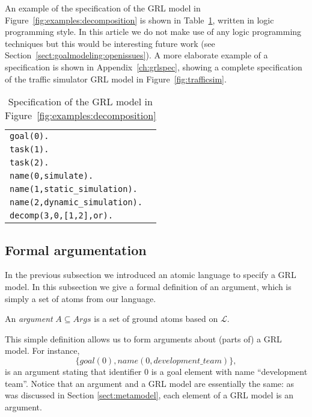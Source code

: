 An example of the specification of the GRL model in Figure~\ref{fig:examples:decomposition} is shown in Table~\ref{table:grl_atom_spec}, written in logic programming style. In this article we do not make use of any logic programming techniques but this would be interesting future work (see Section~\ref{sect:goalmodeling:openissues}). A more elaborate example of a specification is shown in Appendix~\ref{ch:grlspec}, showing a complete specification of the traffic simulator GRL model in Figure~\ref{fig:trafficsim}.

\begin{table}[h!]
\centering
\begin{tabularx}{0.4\textwidth}{|X|}
\hline
\texttt{goal(0).}\\
\texttt{task(1).}\\
\texttt{task(2).}\\
\texttt{name(0,simulate).}\\
\texttt{name(1,static\_simulation).}\\
\texttt{name(2,dynamic\_simulation).}\\
\texttt{decomp(3,0,[1,2],or).}\\
\hline
\end{tabularx}
\caption{Specification of the GRL model in Figure~\ref{fig:examples:decomposition}}
\label{table:grl_atom_spec}
\end{table}

\subsection{Formal argumentation}
\label{sect:goalmodeling:argumentationsemantics}

In the previous subsection we introduced an atomic language to specify a GRL model. In this subsection we give a formal definition of an argument, which is simply a set of atoms from our language.

\begin{definition}[Argument] \label{def:argument}
An \emph{argument} $A\subseteq Args$ is a set of ground atoms based on $\mathcal{L}$.
\end{definition}

This simple definition allows us to form arguments about (parts of) a GRL model. For instance, $$\{goal(0),name(0,development\_team)\},$$ is an argument stating that identifier 0 is a goal element with name ``development team''. Notice that an argument and a GRL model are essentially the same: as was discussed in Section \ref{sect:metamodel}, each element of a GRL model is an argument. 

